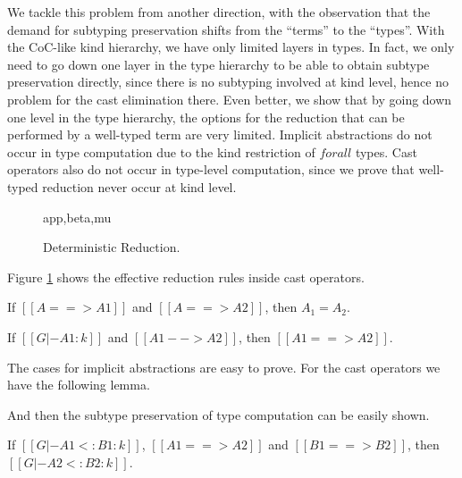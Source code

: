 We tackle this problem from another direction, with the observation that the
demand for subtyping preservation shifts from the ``terms'' to the ``types''.
With the CoC-like kind hierarchy, we have only limited layers in types.
In fact, we only need to go down one layer in the type hierarchy to be able to
obtain subtype preservation directly, since there is no subtyping involved at kind level,
hence no problem for the cast elimination there.
Even better, we show that by going down one level in the type hierarchy, the options
for the reduction that can be performed by a well-typed term are very limited.
Implicit abstractions do not occur in type computation due to the kind
restriction of $forall$ types. Cast operators also do not occur in type-level computation,
since we prove that well-typed reduction never occur at kind level.

\begin{figure}
      {app,beta,mu}
    \caption{Deterministic Reduction.}
    \label{fig:deterministic-reduction}
\end{figure}

Figure \ref{fig:deterministic-reduction} shows the effective reduction rules
inside cast operators.

\begin{lemma}
    If $[[A ==> A1]]$ and $[[A ==> A2]]$,
    then $A_1 = A_2$.
\end{lemma}

\begin{lemma}
    If $[[G |- A1 : k]]$ and $[[A1 --> A2]]$,
    then $[[A1 ==> A2]]$.
\end{lemma}

The cases for implicit abstractions are easy to prove. For the cast operators
we have the following lemma.


And then the subtype preservation of type computation can be easily shown.

\begin{lemma}
    If $[[G |- A1 <: B1 : k]]$, $[[A1 ==> A2]]$ and $[[B1 ==> B2]]$,
    then $[[G |- A2 <: B2 : k]]$.
\end{lemma}

